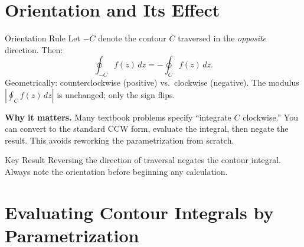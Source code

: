 \documentclass[12pt,a4paper]{article}
\begin{document}
\section{Orientation and Its Effect}

\begin{infobox}{Orientation Rule}
Let $-C$ denote the contour $C$ traversed in the \emph{opposite} direction.
Then:
\[
  \oint_{-C} f(z)\,dz = -\oint_C f(z)\,dz.
\]
Geometrically: counterclockwise (positive) vs.\ clockwise (negative).
The modulus $\left|\oint_C f(z)\,dz\right|$ is unchanged; only the sign flips.
\end{infobox}

\textbf{Why it matters.} Many textbook problems specify ``integrate $C$
clockwise.'' You can convert to the standard CCW form, evaluate the integral,
then negate the result. This avoids reworking the parametrization from scratch.

\begin{center}
\end{center}

\begin{learnbox}{Key Result}
Reversing the direction of traversal negates the contour integral.
Always note the orientation before beginning any calculation.
\end{learnbox}

\section{Evaluating Contour Integrals by Parametrization}
\end{document}
